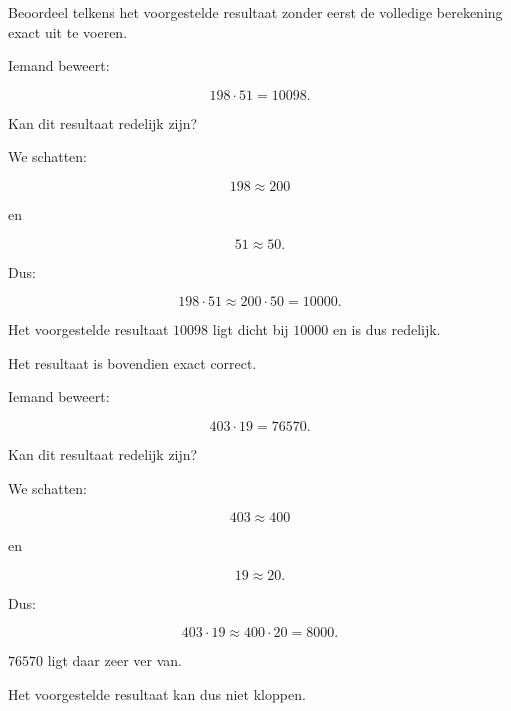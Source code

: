 \documentclass{ximera}
\begin{document}
\begin{oefening}{\oefU\ESS}

Beoordeel telkens het voorgestelde resultaat zonder eerst de volledige
berekening exact uit te voeren.

\begin{question}

Iemand beweert:

\[
198\cdot51=10098.
\]

Kan dit resultaat redelijk zijn?

\begin{oplossing}

We schatten:

\[
198\approx200
\]

en

\[
51\approx50.
\]

Dus:

\[
198\cdot51
\approx
200\cdot50
=
10000.
\]

Het voorgestelde resultaat \(10098\) ligt dicht bij \(10000\) en is dus
redelijk.

Het resultaat is bovendien exact correct.

\end{oplossing}

\end{question}


\begin{question}

Iemand beweert:

\[
403\cdot19=76570.
\]

Kan dit resultaat redelijk zijn?

\begin{oplossing}

We schatten:

\[
403\approx400
\]

en

\[
19\approx20.
\]

Dus:

\[
403\cdot19
\approx
400\cdot20
=
8000.
\]

\(76570\) ligt daar zeer ver van.

Het voorgestelde resultaat kan dus niet kloppen.

\end{oplossing}

\end{question}


\begin{question}


\end{question}
\end{oefening}
\end{document}

